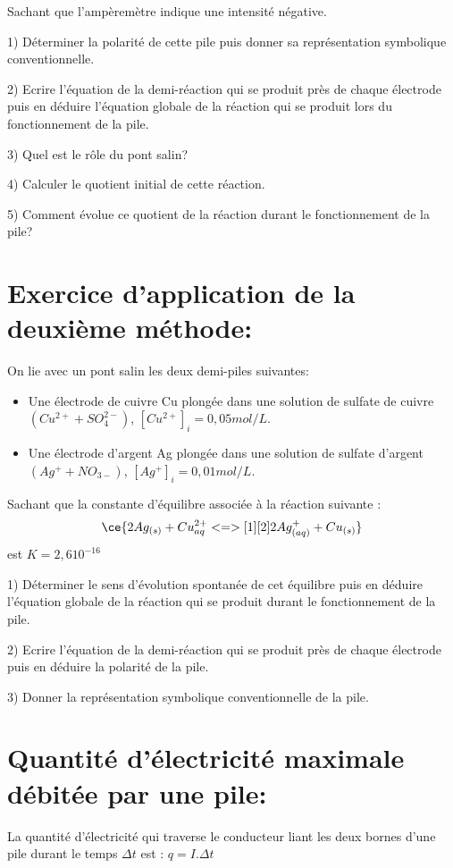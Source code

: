 \documentclass[12pt]{article}
\begin{document}
Sachant que l'ampèremètre indique une intensité négative.

1) Déterminer la polarité de cette pile puis donner sa représentation symbolique conventionnelle.

2) Ecrire l'équation de la demi-réaction qui se produit près de chaque électrode puis en déduire l'équation globale de
la réaction qui se produit lors du fonctionnement de la pile.

3) Quel est le rôle du pont salin?

4) Calculer le quotient initial de cette réaction.

5) Comment évolue ce quotient de la réaction durant le fonctionnement de la pile?



\section*{Exercice d'application de la deuxième méthode: }

On lie avec un pont salin les deux demi-piles suivantes:
\begin{itemize}
	\item  Une électrode de cuivre Cu plongée dans une solution de sulfate de cuivre $(Cu^{2+}+SO_4^{2-})$, $[Cu^{2+}]_i=0,05mol/L$.

	\item Une électrode d'argent Ag plongée dans une solution de sulfate d'argent $(Ag^++NO_{3-})$, $[Ag^+]_i=0,01mol/L$.
\end{itemize}

Sachant que la constante d'équilibre associée à la réaction suivante :$$\ce{2Ag_{(s)} + Cu^{2+}_{aq} <=>[1][2] 2Ag^+_{(aq)} + Cu_{(s)}  }$$ est $K =2,6 10^{-16}$

1) Déterminer le sens d'évolution spontanée de cet équilibre puis en déduire l'équation globale de la réaction qui se produit
durant le fonctionnement de la pile.

2) Ecrire l'équation de la demi-réaction qui se produit près de chaque électrode puis en déduire la polarité de la pile.

3) Donner la représentation symbolique conventionnelle de la pile.


\section{Quantité d'électricité maximale débitée par une pile: }

La quantité d'électricité qui traverse le conducteur liant les deux bornes d'une pile durant le temps $\Delta{t}$ est : $q=I.\Delta{t}$
\end{document}
